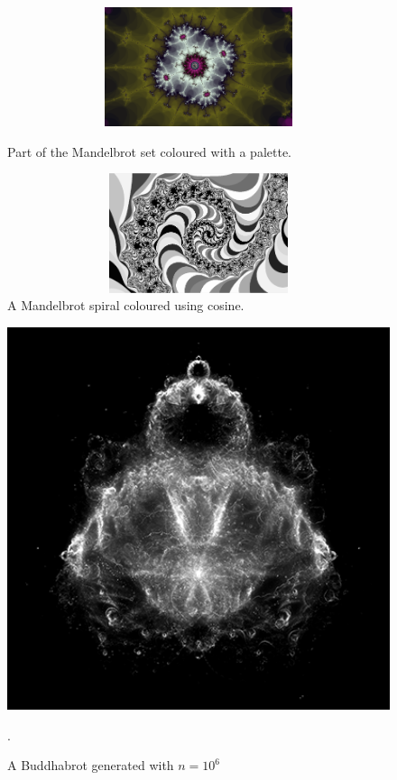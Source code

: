 \documentclass{article}
\begin{document}
\begin{figure}
\centering
\begin{minipage}[ht]{.45\textwidth}
\centering
\includegraphics[width=1.0\textwidth,height=3.5cm]{palette.png}
\caption{Part of the Mandelbrot set coloured with a palette.}
\end{minipage}\hfill
\begin{minipage}[ht]{.45\textwidth}
\centering
\includegraphics[width=1.0\textwidth,height=3.5cm]{cosine.png}
\caption{A Mandelbrot spiral coloured using cosine.}
\end{minipage}
\end{figure}

\begin{figure}[ht]
\centering
\includegraphics[width=120mm]{buddhabrot.png}
\caption{A Buddhabrot generated with $n=10^6$\cite{unreifekirsche}}.
\end{figure}
\end{document}

